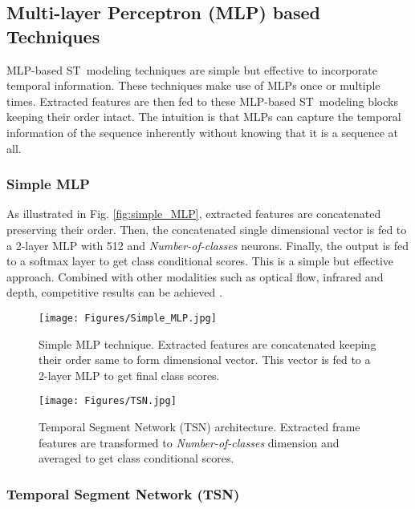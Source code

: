 \documentclass[runningheads]{llncs}
\begin{document}
\subsection{Multi-layer Perceptron (MLP) based Techniques}

MLP-based ST~modeling techniques are simple but effective to incorporate temporal information. These techniques make use of MLPs once or multiple times. Extracted features are then fed to these MLP-based ST~modeling blocks keeping their order intact. The intuition is that MLPs can capture the temporal information of the sequence inherently without knowing that it is a sequence at all.   

\subsubsection{Simple MLP} 

As illustrated in Fig. \ref{fig:simple_MLP}, extracted features are concatenated preserving their order. Then, the concatenated single  dimensional vector is fed to a 2-layer MLP with 512 and \textit{Number-of-classes} neurons. Finally, the output is fed to a softmax layer to get class conditional scores. This is a simple but effective approach. Combined with other modalities such as optical flow, infrared and depth, competitive results can be achieved \cite{kopuklu2018motion}.


\begin{figure}[t!]
\begin{minipage}[b]{0.475\linewidth}
\centering
	\texttt{[image: Figures/Simple\_MLP.jpg]}
\caption{Simple MLP technique. Extracted features are concatenated keeping their order same to form  dimensional vector. This vector is fed to a 2-layer MLP to get final class scores.}
\label{fig:simple_MLP}
\end{minipage}
\hfill
\begin{minipage}[b]{0.475\linewidth}
\centering
    \texttt{[image: Figures/TSN.jpg]}
\caption{Temporal Segment Network (TSN) architecture. Extracted frame features are transformed to \textit{Number-of-classes} dimension and averaged to get class conditional scores.}
\label{fig:TSN_arch}
\end{minipage}
\end{figure}




\subsubsection{Temporal Segment Network (TSN)} 
\end{document}
